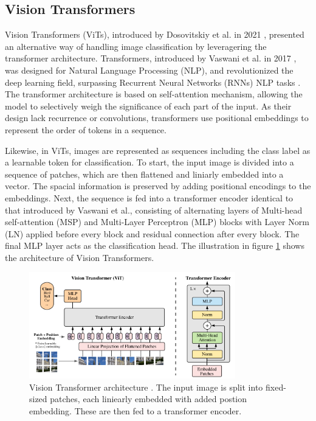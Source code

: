 
\subsection{Vision Transformers}
\label{sec:ViTs}
Vision Transformers (ViTs), introduced by Dosovitskiy et al. in 2021 \cite{dosovitskiy2021imageworth16x16words}, presented an alternative way of handling image classification by leveragering the transformer architecture. Transformers, introduced by Vaswani et al. in 2017 \cite{vaswani2023attentionneed}, was designed for Natural Language Processing (NLP), and revolutionized the deep learning field, surpassing Recurrent Neural Networks (RNNs) NLP tasks \cite{v7labs-vit,vaswani2023attentionneed}. The transformer architecture is based on self-attention mechanism, allowing the model to selectively weigh the significance of each part of the input. As their design lack recurrence or convolutions, transformers use positional embeddings to represent the order of tokens in a sequence. 

Likewise, in ViTs, images are represented as sequences including the class label as a learnable token for classification. To start, the input image is divided into a sequence of patches, which are then flattened and liniarly embedded into a vector. The spacial information is preserved by adding positional encodings to the embeddings. Next, the sequence is fed into a transformer encoder identical to that introduced by Vaswani et al., consisting of alternating layers of Multi-head self-attention (MSP) and Multi-Layer Perceptron (MLP) blocks with Layer Norm (LN) applied before every block and residual connection after every block. The final MLP layer acts as the classification head. The illustration in figure \ref{fig:vit_arch} shows the architecture of Vision Transformers.

\begin{figure}[h!]
    \centering
    \includegraphics[width=0.8\textwidth]{Images/vision_transformer.png} 
    \caption{Vision Transformer architecture \cite{dosovitskiy2021imageworth16x16words}. The input image is split into fixed-sized patches, each liniearly embedded with added postion embedding. These are then fed to a transformer encoder.}
    \label{fig:vit_arch}
\end{figure}

